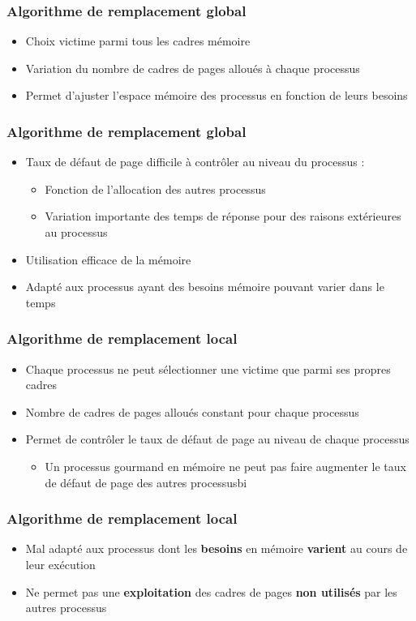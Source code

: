 \begin{frame}
\frametitle{Algorithme de remplacement global}
\begin{itemize}
\item Choix victime parmi tous les cadres mémoire
\item Variation du nombre de cadres de pages alloués à chaque processus
\item Permet d'ajuster l'espace mémoire des processus en fonction de leurs besoins
\end{itemize}
\end{frame}


\begin{frame}
\frametitle{Algorithme de remplacement global}
\begin{itemize}
\item Taux de défaut de page difficile à contrôler au niveau du processus :
\begin{itemize}
\item Fonction de l'allocation des autres processus
\item Variation importante des temps de réponse pour des raisons extérieures au processus
\end{itemize}
\item Utilisation efficace de la mémoire 
\item Adapté aux processus ayant des besoins mémoire pouvant varier dans le temps
\end{itemize}
\end{frame}


\begin{frame}
\frametitle{Algorithme de remplacement local}
\begin{itemize}
\item Chaque processus ne peut sélectionner une victime que parmi ses propres cadres
\item Nombre de cadres de pages alloués constant pour chaque processus
\item Permet de contrôler le taux de défaut de page au niveau de chaque processus
\begin{itemize}
\item Un processus gourmand en mémoire ne peut pas faire augmenter le taux de défaut de page des autres processusbi
\end{itemize}
\end{itemize}
\end{frame}


\begin{frame}
\frametitle{Algorithme de remplacement local}
\begin{itemize}
\item Mal adapté aux processus dont les \textbf{besoins} en mémoire \textbf{varient} au cours de leur exécution
\item Ne permet pas une \textbf{exploitation} des cadres de pages \textbf{non utilisés} par les autres processus
\end{itemize}
\end{frame}


